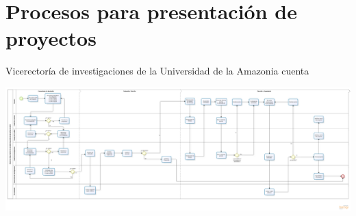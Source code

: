 \chapter{Procesos para presentaci\'on de proyectos}

Vicerector\'ia de investigaciones de la Universidad de la
Amazonia cuenta

\includegraphics[width=\textwidth]{resources/procesos/PROPUESTO_INICIATIVA_FINAL.PNG} %